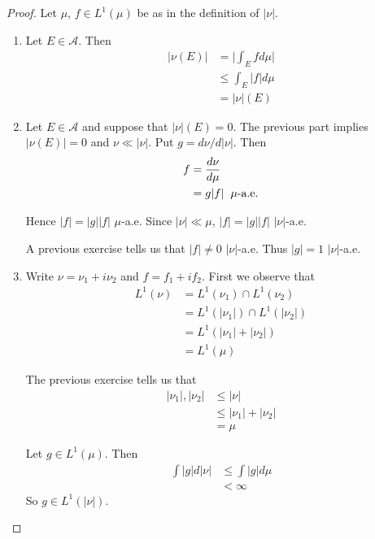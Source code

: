 \documentclass[12pt]{amsart}
\newcommand{\MA}{\mathcal{A}}
\begin{document}
	\begin{proof}
		Let $\mu$, $f \in L^1(\mu)$ be as in the definition of $|\nu|$.
		\begin{enumerate}
			\item Let $E \in \MA$. Then 
			\begin{align*}
				|\nu(E)| 
				& = \bigg|\int_E f d\mu\bigg|\\
				& \leq \int_E |f| d\mu\\
				&= |\nu|(E)
			\end{align*}
			
			\item Let $E \in \MA$ and suppose that $|\nu|(E)=0$. The previous part implies $|\nu(E)|=0$ and $\nu \ll |\nu|$. Put $g = d \nu / d|\nu|$. Then 
			\begin{align*}
				f 
				&= \frac{d\nu}{d\mu}\\
				&= g|f| \hspace{2mm }\mu\text{-a.e.}
			\end{align*}
			
			Hence $|f| = |g||f|$ $\mu$-a.e. Since $|\nu| \ll \mu$, $|f| = |g||f|$ $|\nu|$-a.e.
			
			A previous exercise tells us that $|f| \neq 0$ $|\nu|$-a.e. Thus $|g|=1$ $|\nu|$-a.e.\\
			
			\item Write $\nu = \nu_1 + i\nu_2$ and $f = f_1 + if_2$. First we observe that
			\begin{align*}
				L^1(\nu)
				&= L^1(\nu_1) \cap L^1(\nu_2) \\
				&= L^1(|\nu_1|) \cap L^1(|\nu_2|)\\
				&= L^1(|\nu_1| + |\nu_2|)\\
				&= L^1(\mu)
			\end{align*}
			
			The previous exercise tells us that 
			\begin{align*}
				|\nu_1|, |\nu_2| 
				&\leq |\nu| \\
				&\leq |\nu_1|+ |\nu_2| \\
				&= \mu
			\end{align*}
			
			Let $g \in L^1(\mu)$. Then 
			\begin{align*}
				\int |g| d |\nu| 
				&\leq \int |g| d \mu \\
				&< \infty
			\end{align*}
			So $g \in L^1(|\nu|)$.
			

\end{enumerate}
\end{proof}
\end{document}
